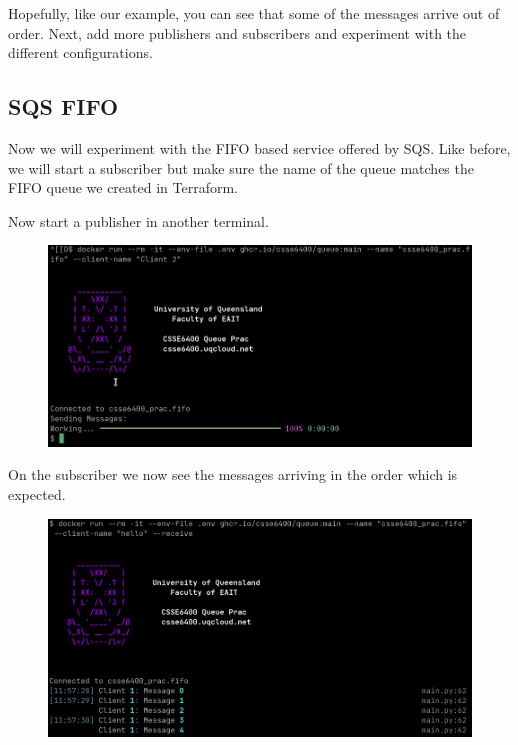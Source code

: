 \documentclass{csse4400}
\begin{document}
Hopefully, like our example, you can see that some of the messages arrive out of order.
Next, add more publishers and subscribers and experiment with the different configurations.



\subsection{SQS FIFO}
Now we will experiment with the FIFO based service offered by SQS.
Like before, we will start a subscriber but make sure the name of the queue matches the FIFO queue we created in Terraform.


Now start a publisher in another terminal.


\begin{figure}[H]
  \includegraphics[width=\textwidth]{images/fifopub}
\end{figure}

On the subscriber we now see the messages arriving in the order which is expected.

\begin{figure}[H]
  \includegraphics[width=\textwidth]{images/fifosub}
\end{figure}
\end{document}
